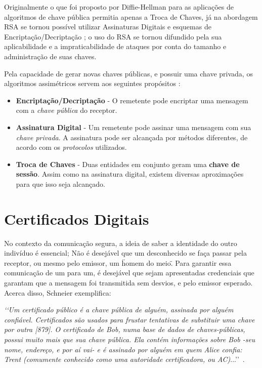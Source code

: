 	Originalmente o que foi proposto por Diffie-Hellman para as aplicações de algoritmos de chave pública permitia apenas a Troca de Chaves, já na abordagem RSA se tornou possível utilizar Assinaturas Digitais \cite[p.~12]{pkcs1} e esquemas de Encriptação/Decriptação \cite[p.~15]{pkcs1}; o uso do RSA se tornou difundido pela sua aplicabilidade e a impraticabilidade de ataques por conta do tamanho e administração de suas chaves.
	
	Pela capacidade de gerar novas chaves públicas, e possuir uma chave privada, os algoritmos assimétricos servem aos seguintes propósitos \cite[p.~275]{stallings11}:
	
	\begin{itemize}
		\item \textbf{Encriptação/Decriptação} - O remetente pode encriptar uma mensagem com a \textit{chave pública} do receptor.
		\item \textbf{Assinatura Digital} - Um remetente pode assinar uma mensagem com sua \textit{chave privada}. A assinatura pode ser alcançada por métodos diferentes, de acordo com os \textit{protocolos} utilizados.
		\item \textbf{Troca de Chaves} - Duas entidades em conjunto geram uma \textbf{chave de sessão}. Assim como na assinatura digital, existem diversas aproximações para que isso seja alcançado. 
	\end{itemize}

\section[Certificados Digitais]{Certificados Digitais}

	No contexto da comunicação segura, a ideia de saber a identidade do outro indivíduo é essencial; Não é desejável que um desconhecido se faça passar pela receptor, ou mesmo pelo emissor, um \"homem do meio\". Para garantir essa comunicação de um para um, é desejável que sejam apresentadas credenciais que garantam que a mensagem foi transmitida sem desvios, e pelo emissor esperado. Acerca disso, Schneier exemplifica:

	\textit{\lq\lq Um certificado público é a chave pública de alguém, assinada por alguém confiável. Certificados são usados para frustar tentativas de substituir uma chave por outra [879]. O certificado de Bob, numa base de dados de chaves-públicas, possui muito mais que sua chave pública. Ela contém informações sobre Bob -seu nome, endereço, e por aí vai- e é assinado por alguém em quem Alice confia: Trent (comumente conhecido como uma autoridade certificadora, ou AC)}...\rq\rq\ \cite[p.~163, com adaptações]{schneier96}.

